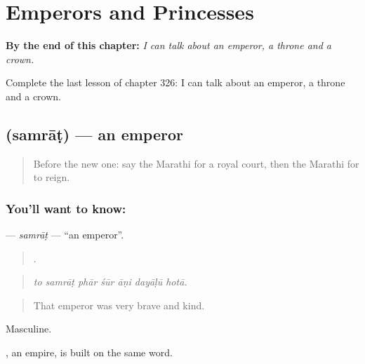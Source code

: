 
\chapter{Emperors and Princesses}
\label{ch:mr-emperors-and-princesses}

\begin{chapteropening}
\textbf{By the end of this chapter:} \emph{I can talk about an emperor, a throne and a crown.}

Complete the last lesson of chapter 326: I can talk about an emperor, a throne and a crown.
\end{chapteropening}

\section[\texorpdfstring{\mr{सम्राट} (samrāṭ)}{सम्राट (samrāṭ)}]{ (samrāṭ) — an emperor}

\label{lesson:MR-C326-samrat}



\begin{quote}
Before the new one: say the Marathi for a royal court, then the Marathi for to reign.
\end{quote}

\subsection*{You'll want to know: }
\textbf{} — \emph{samrāṭ} — \textquotedblleft{}an emperor\textquotedblright{}.

\begin{quote}
      .
\end{quote}

\begin{quote}
\emph{to samrāṭ phār śūr āṇi dayāḷū hotā.}
\end{quote}

\begin{quote}
That emperor was very brave and kind.
\end{quote}

Masculine.

, an empire, is built on the same word.

